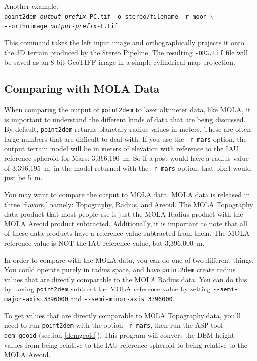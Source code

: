 Another example: \\
\hspace*{2em}\texttt{point2dem \textit{output-prefix}-PC.tif -o stereo/filename -r moon $\backslash$} \\
\hspace*{4em}\texttt{-\/-orthoimage \textit{output-prefix}-L.tif}

This command takes the left input image and orthographically projects
it onto the 3D terrain produced by the Stereo Pipeline.  The resulting
{\tt *-DRG.tif} file will be saved as an 8-bit GeoTIFF image in a
simple cylindrical map-projection.

\subsection{Comparing with MOLA Data}

When comparing the output of \texttt{point2dem} to laser altimeter
data, like MOLA, it is important to understand the different kinds
of data that are being discussed.  By default, \texttt{point2dem}
returns planetary radius values in meters.  These are often large
numbers that are difficult to deal with.  If you use the \texttt{-r
mars} option, the output terrain model will be in meters of elevation
with reference to the IAU reference spheroid for Mars: 3,396,190~m.
So if a post would have a radius value of 3,396,195~m, in the model
returned with the \texttt{-r mars} option, that pixel would just be 5~m.

You may want to compare the output to MOLA data.  MOLA data is
released in three `flavors,' namely: Topography, Radius, and Areoid.
The MOLA Topography data product that most people use is just the MOLA Radius
product with the MOLA Areoid product subtracted.  Additionally, it is
important to note that all of these data products have a reference
value subtracted from them.  The MOLA reference value is NOT the
IAU reference value, but 3,396,000~m.

In order to compare with the MOLA data, you can do one of two
different things.  You could operate purely in radius space, and
have \texttt{point2dem} create radius values that are directly
comparable to the MOLA Radius data.  You can do this by having
\texttt{point2dem} subtract the MOLA reference value by setting
\texttt{-\/-semi-major-axis 3396000} and \texttt{-\/-semi-minor-axis
3396000}.

To get values that are directly comparable to MOLA Topography data,
you'll need to run \texttt{point2dem} with the option \texttt{-r mars},
then run the ASP tool \texttt{dem\_geoid} (section \ref{demgeoid}). This
program will convert the DEM height values from being relative to the IAU
reference spheroid to being relative to the MOLA Areoid.

